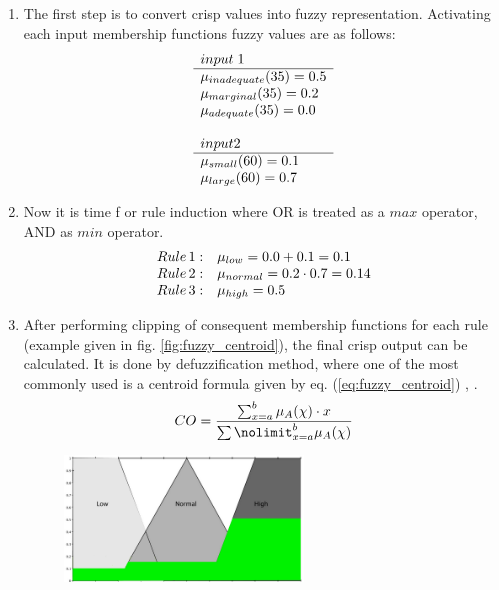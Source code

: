 \begin{enumerate}
    \item The first step is to convert crisp values into fuzzy representation.
        Activating each input membership functions fuzzy values are as follows:
        $$
            \begin{array}[H]{l}
                input \;1 \\ \hline
                \mu_{inadequate}(35) = 0.5 \\
                \mu_{marginal}(35) = 0.2 \\
                \mu_{adequate}(35) = 0.0 \\ \\
                input 2 \\ \hline
                \mu_{small}(60) = 0.1 \\
                \mu_{large}(60) = 0.7 \\ 
            \end{array}
        $$
    \item Now it is time f or rule induction where OR is treated as a $max$ operator, AND
        as $min$ operator. 
        $$
            \begin{array}[H]{ll}
                Rule \,1: & \mu_{low} = 0.0 + 0.1 = 0.1 \\
                Rule \,2: & \mu_{normal} = 0.2\cdot 0.7 = 0.14 \\
                Rule \,3: & \mu_{high} = 0.5 \\
            \end{array}
        $$
    \item After performing clipping of consequent membership functions for each
        rule (example given in fig. \ref{fig:fuzzy_centroid}), the final crisp output can be calculated. It is done by
        defuzzification method, where one of the most commonly used is a centroid
        formula given by eq. (\ref{eq:fuzzy_centroid}) \cite{bib0}, \cite{bib1}.
        \begin{equation}
            CO = \frac{\sum\nolimits_{x=a}^{b}\mu_A(\chi)\cdot
            x}{\sum\nolimit_{x=a}^{b}\mu_A(\chi)}
            \label{eq:fuzzy_centroid}
        \end{equation}
        \begin{figure}[H]
            \begin{center}
                \includegraphics[width=0.6\textwidth, height=0.4\textwidth]{fig/fuzzy_centroid.png}

\end{center}
\end{figure}
\end{enumerate}
